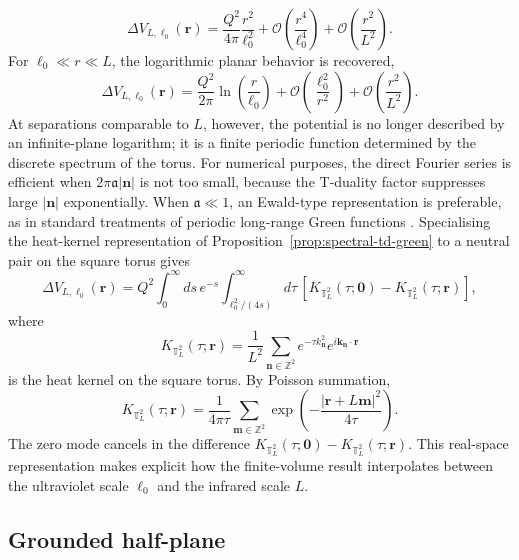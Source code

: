 \documentclass[nopacs,amsmath,amsfonts,amssymb,aps,superscriptaddress]{revtex4}
\begin{document}
\begin{equation}
  \Delta V_{L,\ell_0}(\mathbf r)=\frac{Q^2}{4\pi}\frac{r^2}{\ell_0^2}
  +\mathcal O\!\left(\frac{r^4}{\ell_0^4}\right)
  +\mathcal O\!\left(\frac{r^2}{L^2}\right).
\end{equation}
For \(\ell_0\ll r\ll L\), the logarithmic planar behavior is recovered,
\begin{equation}
\Delta V_{L,\ell_0}(\mathbf r)=\frac{Q^2}{2\pi}\ln\left(\frac{r}{\ell_0}\right)
+\mathcal O\!\left(\frac{\ell_0^2}{r^2}\right)
+\mathcal O\!\left(\frac{r^2}{L^2}\right).
\end{equation}
At separations comparable to \(L\), however, the potential is no longer described by an infinite-plane logarithm; it is a finite periodic function determined by the discrete spectrum of the torus. For numerical purposes, the direct Fourier series is efficient when \(2\pi\mathfrak a|\mathbf n|\) is not too small, because the T-duality factor suppresses large \(|\mathbf n|\) exponentially. When \(\mathfrak a\ll1\), an Ewald-type representation is preferable, as in standard treatments of periodic long-range Green functions \cite{Ewald1921,Linton1998}. Specialising the heat-kernel representation of Proposition~\ref{prop:spectral-td-green} to a neutral pair on the square torus gives
\begin{equation}
  \Delta V_{L,\ell_0}(\mathbf r)=Q^2\int_0^\infty ds\,e^{-s}\int_{\ell_0^2/(4s)}^\infty d\tau\,
  \left[K_{\mathbb T^2_L}(\tau;\mathbf 0)-K_{\mathbb T^2_L}(\tau;\mathbf r)\right],
\end{equation}
where
\begin{equation}
  K_{\mathbb T^2_L}(\tau;\mathbf r)=\frac{1}{L^2}\sum_{\mathbf n\in\mathbb Z^2}
  e^{-\tau k_{\mathbf n}^2}e^{i\mathbf k_{\mathbf n}\cdot\mathbf r}
\end{equation}
is the heat kernel on the square torus. By Poisson summation,
\begin{equation}
  K_{\mathbb T^2_L}(\tau;\mathbf r)=\frac{1}{4\pi\tau}\sum_{\mathbf m\in\mathbb Z^2}
  \exp\left(-\frac{|\mathbf r+L\mathbf m|^2}{4\tau}\right).
\end{equation}
The zero mode cancels in the difference \(K_{\mathbb T^2_L}(\tau;\mathbf 0)-K_{\mathbb T^2_L}(\tau;\mathbf r)\). This real-space representation makes explicit how the finite-volume result interpolates between the ultraviolet scale \(\ell_0\) and the infrared scale \(L\).


\subsection{Grounded half-plane}\label{subsec:half_plane}
\end{document}
